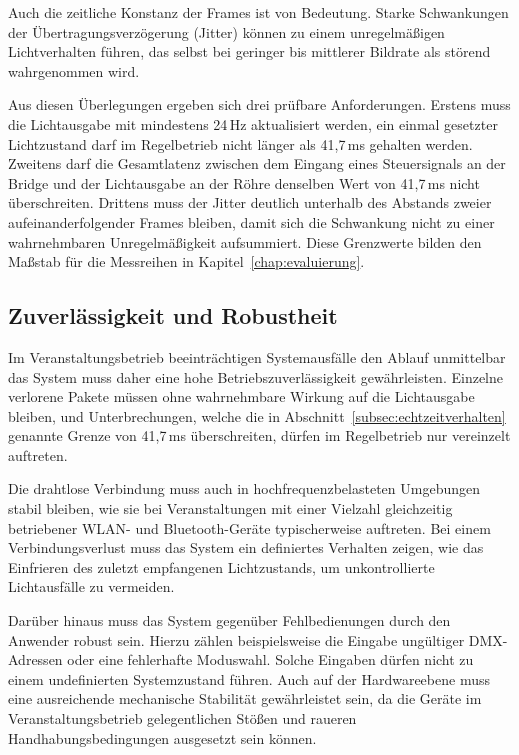 Auch die zeitliche Konstanz der Frames ist von Bedeutung. Starke Schwankungen der
Übertragungsverzögerung (Jitter) können zu einem unregelmäßigen Lichtverhalten führen,
das selbst bei geringer bis mittlerer Bildrate als störend wahrgenommen wird.

Aus diesen Überlegungen ergeben sich drei prüfbare Anforderungen. Erstens muss die
Lichtausgabe mit mindestens 24\,Hz aktualisiert werden, ein einmal gesetzter
Lichtzustand darf im Regelbetrieb nicht länger als 41,7\,ms gehalten werden. Zweitens
darf die Gesamtlatenz zwischen dem Eingang eines Steuersignals an der Bridge und der
Lichtausgabe an der Röhre denselben Wert von 41,7\,ms nicht überschreiten. Drittens
muss der Jitter deutlich unterhalb des Abstands zweier aufeinanderfolgender Frames
bleiben, damit sich die Schwankung nicht zu einer wahrnehmbaren Unregelmäßigkeit
aufsummiert. Diese Grenzwerte bilden den Maßstab für die Messreihen in
Kapitel~\ref{chap:evaluierung}.

\subsection{Zuverlässigkeit und Robustheit}
\label{subsec:zuverlaessigkeit}

Im Veranstaltungsbetrieb beeinträchtigen Systemausfälle den Ablauf unmittelbar das
System muss daher eine hohe Betriebszuverlässigkeit gewährleisten.
Einzelne verlorene Pakete müssen ohne wahrnehmbare Wirkung auf die Lichtausgabe bleiben,
und Unterbrechungen, welche die in Abschnitt~\ref{subsec:echtzeitverhalten} genannte
Grenze von 41,7\,ms überschreiten, dürfen im Regelbetrieb nur vereinzelt auftreten.

Die drahtlose Verbindung muss auch in hochfrequenzbelasteten Umgebungen stabil
bleiben, wie sie bei Veranstaltungen mit einer Vielzahl gleichzeitig betriebener
WLAN- und Bluetooth-Geräte typischerweise auftreten. Bei einem Verbindungsverlust
muss das System ein definiertes Verhalten zeigen, wie das Einfrieren
des zuletzt empfangenen Lichtzustands, um unkontrollierte Lichtausfälle zu
vermeiden.

Darüber hinaus muss das System gegenüber Fehlbedienungen durch den Anwender
robust sein. Hierzu zählen beispielsweise die Eingabe ungültiger DMX-Adressen
oder eine fehlerhafte Moduswahl. Solche Eingaben dürfen nicht zu einem
undefinierten Systemzustand führen. Auch auf der Hardwareebene muss eine
ausreichende mechanische Stabilität gewährleistet sein, da die Geräte im
Veranstaltungsbetrieb gelegentlichen Stößen und raueren Handhabungsbedingungen
ausgesetzt sein können.

